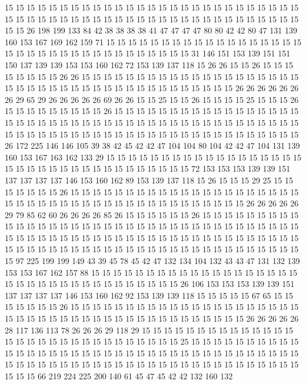 15 15 15 15 15 15 15 15 15 15 15 15 15 15 15 15 15 15 15 15
15 15 15 15 15 15 15 15 15 15 15 15 15 15 15 15 15 15 15 15
15 15 15 15 15 15 15 15 15 15 15 15 15 15 15 15 26 198 199 133
84 42 38 38 38 38 41 47 47 47 47 80 80 42 42 80 47 131 139 160
153 167 169 162 159 71 15 15 15 15 15 15 15 15 15 15 15 15 15 15
15 15 15 15 15 15 15 15 15 15 15 15 15 15 15 15 15 15 15 15
15 31 146 151 153 139 151 151 150 137 139 139 153 153 160 162 72 153 139 137
118 15 26 26 15 15 26 15 15 15 15 15 15 15 15 26 26 15 15 15
15 15 15 15 15 15 15 15 15 15 15 15 15 15 15 15 15 15 15 15
15 15 15 15 15 15 15 15 15 15 15 15 15 15 15 15 15 15 26 26
26 26 26 26 26 29 65 29 26 26 26 26 26 69 26 26 15 15 25 15
15 26 15 15 15 15 25 15 15 15 26 15 15 15 15 15 15 15 15 15
26 15 15 15 15 15 15 15 15 15 15 15 15 15 15 15 15 15 15 15
15 15 15 15 15 15 15 15 15 15 15 15 15 15 15 15 15 15 15 15
15 15 15 15 15 15 15 15 15 15 15 15 15 15 15 15 15 15 15 15
15 15 15 15 15 15 15 15 15 15 15 15 26 172 225 146 146 105 39 38
42 45 42 42 47 104 104 80 104 42 42 47 104 131 139 160 153 167 163 162
133 29 15 15 15 15 15 15 15 15 15 15 15 15 15 15 15 15 15 15
15 15 15 15 15 15 15 15 15 15 15 15 15 15 15 15 15 72 153 153
153 139 139 151 137 137 137 137 146 153 160 162 89 153 139 137 118 15 26 15
15 15 29 25 15 15 15 15 15 15 15 26 15 15 15 15 15 15 15 15
15 15 15 15 15 15 15 15 15 15 15 15 15 15 15 15 15 15 15 15
15 15 15 15 15 15 15 15 15 15 15 15 15 15 15 26 26 26 26 26
29 79 85 62 60 26 26 26 26 85 26 15 15 15 15 15 15 26 15 15
15 15 15 15 15 15 15 15 15 15 15 15 15 15 15 15 15 15 15 15
15 15 15 15 15 15 15 15 15 15 15 15 15 15 15 15 15 15 15 15
15 15 15 15 15 15 15 15 15 15 15 15 15 15 15 15 15 15 15 15
15 15 15 15 15 15 15 15 15 15 15 15 15 15 15 15 15 15 15 15
15 15 15 15 15 15 15 15 15 97 225 199 199 149 43 39 45 78 45 42
47 132 134 104 132 43 43 47 131 132 139 153 153 167 162 157 88 15 15 15
15 15 15 15 15 15 15 15 15 15 15 15 15 15 15 15 15 15 15 15
15 15 15 15 15 15 15 15 15 15 15 15 26 106 153 153 153 139 139 151
137 137 137 137 146 153 160 162 92 153 139 139 118 15 15 15 15 15 67 65
15 15 15 15 15 15 15 26 15 15 15 15 15 15 15 15 15 15 15 15
15 15 15 15 15 15 15 15 15 15 15 15 15 15 15 15 15 15 15 15
15 15 15 15 15 15 15 15 15 15 15 26 26 26 26 26 28 117 136 113
78 26 26 26 29 118 29 15 15 15 15 15 15 15 15 15 15 15 15 15
15 15 15 15 15 15 15 15 15 15 15 15 15 15 15 15 15 25 15 15
15 15 15 15 15 15 15 15 15 15 15 15 15 15 15 15 15 15 15 15
15 15 15 15 15 15 15 15 15 15 15 15 15 15 15 15 15 15 15 15
15 15 15 15 15 15 15 15 15 15 15 15 15 15 15 15 15 15 15 15
15 15 15 15 15 66 219 224 225 200 140 61 45 47 45 42 42 132 160 132
